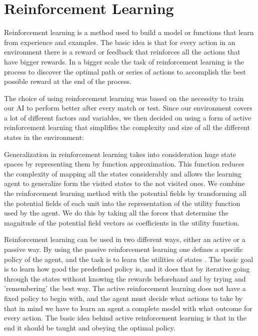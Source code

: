 \section{Reinforcement Learning}

	Reinforcement learning is a method used to build a model or functions that learn from experience and examples. The basic idea is that for every action in an environment there is a reward or feedback that reinforces all the actions that have bigger rewards. In a bigger scale the task of reinforcement learning is the process to discover the optimal path or series of actions to accomplish the best possible reward at the end of the process. 

	The choice of using reinforcement learning was based on the necessity to train our AI to perform better after every match or test. Since our environment covers a lot of different factors and variables, we then decided on using a form of active reinforcement learning that simplifies the complexity and size of all the different states in the environment: 

	Generalization in reinforcement learning takes into consideration huge state spaces by representing them by function approximation. This function reduces the complexity of mapping all the states considerably and allows the learning agent to generalize form the visited states to the not visited ones. We combine the reinforcement learning method with the potential fields by transforming all the potential fields of each unit into the representation of the utility function used by the agent. We do this by taking all the forces that determine the magnitude of the potential field vectors as coefficients in the utility function.
	
	
	Reinforcement learning can be used in two different ways, either an active or a passive way. By using the passive reinforcement learning one defines a specific policy of the agent, and the task is to learn the utilities of states \cite{rl}. The basic goal is to learn how good the predefined policy is, and it does that by iterative going through the states without knowing the rewards beforehand and by trying and 'remembering' the best way. The active reinforcement learning does not have a fixed policy to begin with, and the agent must decide what actions to take \cite[p771]{rl} by that in mind we have to learn an agent a complete model with what outcome for every action. The basic idea behind active reinforcement learning is that in the end it should be taught and obeying the optimal policy.

